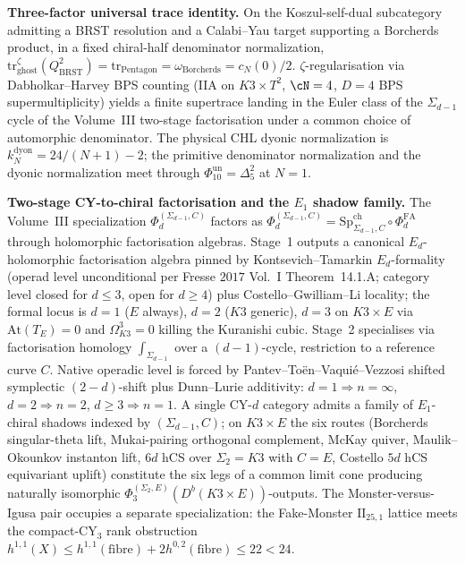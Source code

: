 \smallskip\noindent\textbf{Three-factor universal trace identity.}
On the Koszul-self-dual subcategory admitting a BRST resolution and a
Calabi--Yau target supporting a Borcherds product, in a fixed
chiral-half denominator normalization,
$\mathrm{tr}^\zeta_{\mathrm{ghost}}(Q_{\mathrm{BRST}}^2)
= \mathrm{tr}_{\mathrm{Pentagon}}
= \omega_{\mathrm{Borcherds}}
= c_N(0)/2$. $\zeta$-regularisation via Dabholkar--Harvey BPS counting
(IIA on $K3\times T^2$, $\cN=4$, $D=4$ BPS supermultiplicity) yields a
finite supertrace landing in the Euler class of the $\Sigma_{d-1}$
cycle of the Volume~III two-stage factorisation under a common choice
of automorphic denominator. The physical CHL dyonic normalization is
$k_N^{\mathrm{dyon}}=24/(N+1)-2$; the primitive denominator
normalization and the dyonic normalization meet through
$\Phi_{10}^{\mathrm{un}}=\Delta_5^2$ at $N=1$.

\smallskip\noindent\textbf{Two-stage CY-to-chiral factorisation and
the $E_1$ shadow family.} The Volume~III specialization
$\Phi_d^{(\Sigma_{d-1},C)}$ factors as
$\Phi_d^{(\Sigma_{d-1},C)} = \mathrm{Sp}^{\mathrm{ch}}_{\Sigma_{d-1},C}\circ\Phi^{\mathrm{FA}}_d$
through holomorphic factorisation algebras. Stage~1 outputs a
canonical $E_d$-holomorphic factorisation algebra pinned by
Kontsevich--Tamarkin $E_d$-formality (operad level unconditional per
Fresse $2017$ Vol.~I Theorem~14.1.A; category level closed for
$d\le 3$, open for $d\ge 4$) plus Costello--Gwilliam--Li locality;
the formal locus is $d=1$ ($E$ always), $d=2$ ($K3$ generic),
$d=3$ on $K3\times E$ via $\mathrm{At}(T_E)=0$ and
$\Omega^3_{K3}=0$ killing the Kuranishi cubic. Stage~2 specialises via
factorisation homology $\int_{\Sigma_{d-1}}$ over a $(d-1)$-cycle,
restriction to a reference curve $C$. Native operadic level is
forced by Pantev--To\"en--Vaqui\'e--Vezzosi shifted symplectic
$(2-d)$-shift plus Dunn--Lurie additivity: $d=1\Rightarrow n=\infty$,
$d=2\Rightarrow n=2$, $d\ge 3\Rightarrow n=1$. A single CY-$d$
category admits a family of $E_1$-chiral shadows indexed by
$(\Sigma_{d-1},C)$; on $K3\times E$ the six routes (Borcherds
singular-theta lift, Mukai-pairing orthogonal complement, McKay
quiver, Maulik--Okounkov instanton lift, $6d$ hCS over $\Sigma_2=K3$
with $C=E$, Costello $5d$ hCS equivariant uplift) constitute the six
legs of a common limit cone producing naturally isomorphic
$\Phi_3^{(\Sigma_2,E)}(D^b(K3\times E))$-outputs. The
Monster-versus-Igusa pair occupies a separate specialization: the
Fake-Monster $\mathrm{II}_{25,1}$ lattice meets the compact-CY$_3$
rank obstruction
$h^{1,1}(X)\le h^{1,1}(\text{fibre})+2h^{0,2}(\text{fibre})\le 22 < 24$.

